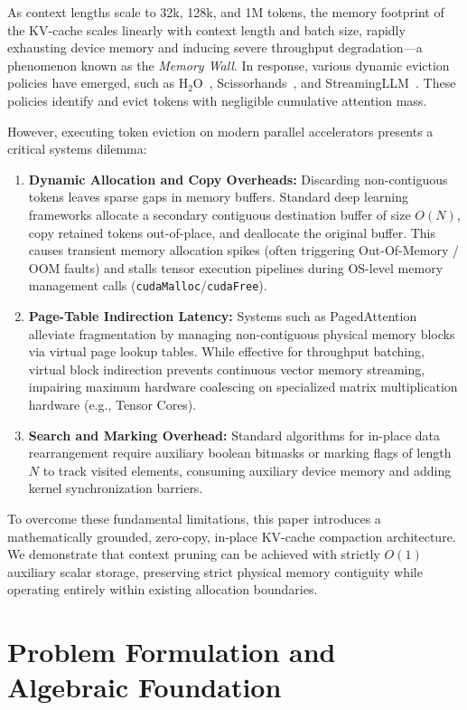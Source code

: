 \documentclass[journal,10pt,twocolumn]{article}
\begin{document}
As context lengths scale to 32k, 128k, and 1M tokens, the memory footprint of the KV-cache scales linearly with context length and batch size, rapidly exhausting device memory and inducing severe throughput degradation---a phenomenon known as the \textit{Memory Wall}. In response, various dynamic eviction policies have emerged, such as $\text{H}_2\text{O}$~\cite{zhang2023h2o}, Scissorhands~\cite{liu2023scissorhands}, and StreamingLLM~\cite{xiao2023efficient}. These policies identify and evict tokens with negligible cumulative attention mass.


However, executing token eviction on modern parallel accelerators presents a critical systems dilemma:
\begin{enumerate}
    \item \textbf{Dynamic Allocation and Copy Overheads:} Discarding non-contiguous tokens leaves sparse gaps in memory buffers. Standard deep learning frameworks allocate a secondary contiguous destination buffer of size $O(N)$, copy retained tokens out-of-place, and deallocate the original buffer. This causes transient memory allocation spikes (often triggering Out-Of-Memory / OOM faults) and stalls tensor execution pipelines during OS-level memory management calls (\texttt{cudaMalloc}/\texttt{cudaFree}).
    \item \textbf{Page-Table Indirection Latency:} Systems such as PagedAttention~\cite{kwon2023efficient} alleviate fragmentation by managing non-contiguous physical memory blocks via virtual page lookup tables. While effective for throughput batching, virtual block indirection prevents continuous vector memory streaming, impairing maximum hardware coalescing on specialized matrix multiplication hardware (e.g., Tensor Cores).
    \item \textbf{Search and Marking Overhead:} Standard algorithms for in-place data rearrangement require auxiliary boolean bitmasks or marking flags of length $N$ to track visited elements, consuming auxiliary device memory and adding kernel synchronization barriers.
\end{enumerate}

To overcome these fundamental limitations, this paper introduces a mathematically grounded, zero-copy, in-place KV-cache compaction architecture. We demonstrate that context pruning can be achieved with strictly $O(1)$ auxiliary scalar storage, preserving strict physical memory contiguity while operating entirely within existing allocation boundaries.

\section{Problem Formulation and Algebraic Foundation}
\label{sec:formulation}
\end{document}
